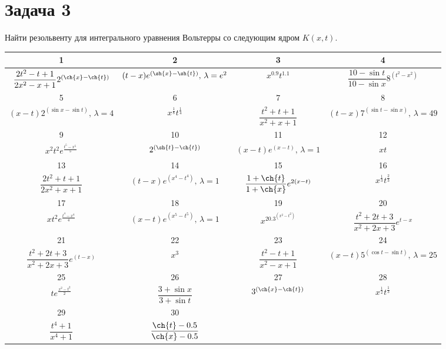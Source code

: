 \documentclass[a4paper,final,12pt]{article}
\begin{document}
\section*{Задача 3}
Найти резольвенту для интегрального уравнения Вольтерры со следующим ядром
$K(x,t).$
\vspace{0.5cm}

\begin{center}
	\begin{longtable}{|c|c|c|c|}
		\hline
		1 & 2 & 3 & 4 \\
		\hline
		$\dfrac{2t^2-t+1}{2x^2-x+1}2^{(\ch{x}-\ch{t})}$ & $(t-x)e^{(\sh{x}-\sh{t})},\,\lambda=e^2$ & $x^{0.9}t^{1.1}$ & $\dfrac{10-\sin{t}}{10-\sin{x}}8^{(t^2-x^2)}$ \\
		\hline
		5 & 6 & 7 & 8 \\
		\hline
		$(x-t)2^{(\sin{x}-\sin{t})},\,\lambda=4$ & $x^\frac18t^\frac14$ & $\dfrac{t^2+t+1}{x^2+x+1}$ & $(t-x)7^{(\sin{t}-\sin{x})},\,\lambda=49$ \\
		\hline
		9 & 10 & 11 & 12\\
		\hline
		$x^2t^2e^\frac{t^5-x^5}{5}$ & $2^{(\sh{t}-\ch{t})}$ & $(x-t)e^{(x-t)},\,\lambda=1$ & $xt$ \\
		\hline
		13 & 14 & 15 & 16\\
		\hline
		$\dfrac{2t^2+t+1}{2x^2+x+1}$ & $(t-x)e^{(x^4-t^4)},\,\lambda=1$	& $\dfrac{1+\ch{t}}{1+\ch{x}}e^{2(x-t)}$ & $x^\frac13t^\frac23$ \\
		\hline
		17 & 18 & 19 & 20\\
		\hline
		$xt^2e^\frac{t^4-x^4}{4}$ & $(x-t)e^{(x^5-t^5)},\,\lambda=1$	& $x^20.3^{(x^2-t^2)}$ & $\dfrac{t^2+2t+3}{x^2+2x+3}e^{t-x}$ \\	
		\hline
		21 & 22 & 23 & 24\\
		\hline
		$\dfrac{t^2+2t+3}{x^2+2x+3}e^{(t-x)}$ & $x^3$	& $\dfrac{t^2-t+1}{x^2-x+1}$ & $(x-t)5^{(\cos{t}-\sin{t})},\,\lambda=25$ \\	
		\hline
		25 & 26 & 27 & 28\\
		\hline
		$te^\frac{x^2-t^2}{2}$ & $\dfrac{3+\sin{x}}{3+\sin{t}}$	& $3^{(\ch{x}-\ch{t})}$ & $x^\frac12t^\frac13$ \\	
		\hline
		29 & 30 &  & \\
		\hline
		$\dfrac{t^4+1}{x^4+1}$ & $\dfrac{\ch{t}-0.5}{\ch{x}-0.5}$	&  &  \\	
		\hline						
	\end{longtable}
\end{center}
\end{document}
